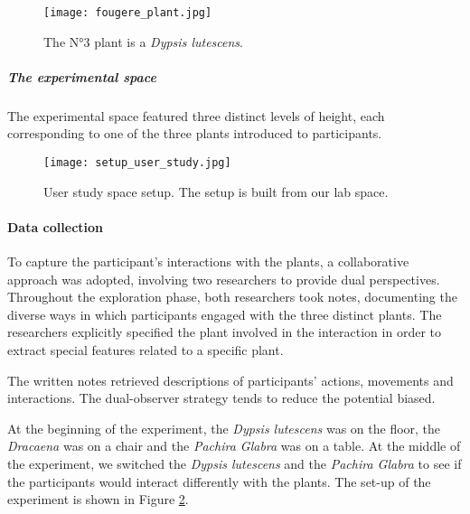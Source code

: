 \begin{figure}[h!]
    \centering
    \texttt{[image: fougere\_plant.jpg]}
    \caption{The N°3 plant is a \textit{Dypsis lutescens}.}
    
    \vspace{-0.5cm}
    \label{fig:fougere_plant}
    \vspace{0.2cm}
\end{figure}



\subparagraph*{The experimental space}
The experimental space featured three distinct levels of height, each corresponding to one of the three plants introduced to participants.

\begin{figure}[h]
    \centering
    \texttt{[image: setup\_user\_study.jpg]}
    \caption{User study space setup. The setup is built from our lab space.}
    
    \vspace{-0.5cm}
    \label{fig:setup_user_study}
    \vspace{0.2cm}
\end{figure}

\paragraph{Data collection}
To capture the participant's interactions with the plants, a collaborative approach was adopted, involving two researchers to provide dual perspectives.
Throughout the exploration phase, both researchers took notes, documenting the diverse ways in which participants engaged with the three distinct plants.
The researchers explicitly specified the plant involved in the interaction in order to extract special features related to a specific plant.

The written notes retrieved descriptions of participants' actions, movements and interactions.
The dual-observer strategy tends to reduce the potential biased.

At the beginning of the experiment, the \textit{Dypsis lutescens} was on the floor, the \textit{Dracaena} was on a chair and the \textit{Pachira Glabra} was on a table.
At the middle of the experiment, we switched the \textit{Dypsis lutescens} and the \textit{Pachira Glabra} to see if the participants would interact differently with the plants.
The set-up of the experiment is shown in Figure \ref{fig:setup_user_study}. 


